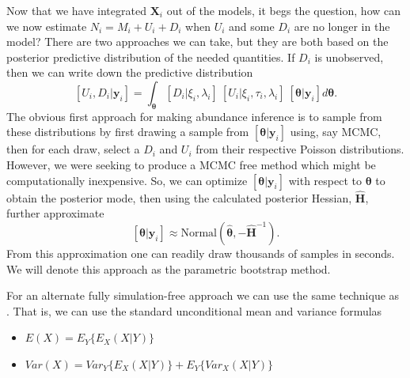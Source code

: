 \documentclass[fleqn,10pt]{wlscirep}
\begin{document}
{Now that we have integrated \(\mathbf{X}_i\) out of the models, it begs the question, how can we now estimate \(N_i = M_i + U_i + D_i\) when \(U_i\) and some \(D_i\) are no longer in the model? There are two approaches we can take, but they are both based on the posterior predictive distribution of the needed quantities. If \(D_i\) is unobserved, then we can write down the predictive distribution
\[
[U_i, D_i|\mathbf{y}_i] = \int_{\boldsymbol{\theta}} [D_i|\xi_i, \lambda_i]\ [U_i|\xi_i, \tau_i, \lambda_i]\ [\boldsymbol{\theta}|\mathbf{y}_i] d\boldsymbol{\theta}.
\]
The obvious first approach for making abundance inference is to sample from these distributions by first drawing a sample from \([\boldsymbol{\theta}|\mathbf{y}_i]\) using, say MCMC, then for each draw, select a \(D_i\) and \(U_i\) from their respective Poisson distributions. However, we were seeking to produce a MCMC free method which might be computationally inexpensive. So, we can optimize \([\boldsymbol{\theta}|\mathbf{y}_i]\) with respect to \(\boldsymbol{\theta}\) to obtain the posterior mode, then using the calculated posterior Hessian, \(\hat{\mathbf{H}}\), further approximate
\[
[\boldsymbol{\theta}|\mathbf{y}_i] \approx \text{Normal}\left(\hat{\boldsymbol{\theta}}, -\hat{\mathbf{H}}^{-1}\right).
\]
From this approximation one can readily draw thousands of samples in seconds. We will denote this approach as the parametric bootstrap method.

For an alternate fully simulation-free approach we can use the same technique as \cite{johnson2010model}. That is, we can use the standard unconditional mean and variance formulas

\begin{itemize}
\tightlist
\item
  \(E(X) = E_Y\{E_X(X|Y)\}\)
\item
  \(Var(X) = Var_Y\{E_X(X|Y)\} + E_Y\{Var_X(X|Y)\}\)
\end{itemize}

}
\end{document}
